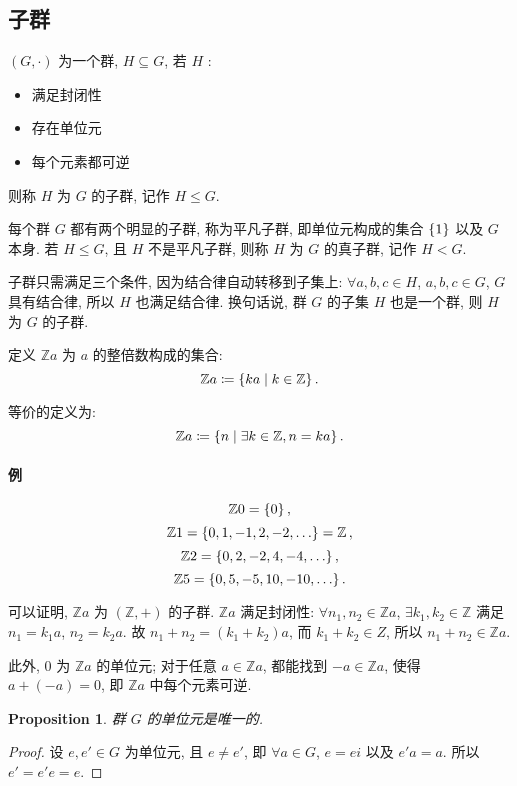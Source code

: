 \documentclass[UTF8]{ctexart}
\theoremstyle{mystyle}
\newtheorem{proposition}{Proposition}[section]
\theoremstyle{myremark}
\theoremstyle{plain}
\newcommand{\Z}{\mathbb Z}
\DeclarePairedDelimiter\set{\{}{\}}
\begin{document}
\subsection{子群}
\begin{definition}[\text{子群}]
    $ (G, \cdot) $ 为一个群, $ H \subseteq G $, 若 $ H $ :
    \begin{itemize}
        \item 满足封闭性
        \item 存在单位元
        \item 每个元素都可逆
    \end{itemize}
    则称 $ H $ 为 $ G $ 的子群, 记作 $ H \le G $.

    每个群 $ G $ 都有两个明显的子群, 称为平凡子群, 即单位元构成的集合 $ \set{1} $ 以及 $ G $ 本身. 若 $ H \le G $, 且 $ H $ 不是平凡子群, 则称 $ H $ 为 $ G $ 的真子群, 记作 $ H < G $.
\end{definition}

子群只需满足三个条件, 因为结合律自动转移到子集上: $ \forall a, b, c \in H $, $ a, b, c \in G $, $ G $ 具有结合律, 所以 $ H $ 也满足结合律. 换句话说, 群 $ G $ 的子集 $ H $ 也是一个群, 则 $ H $ 为 $ G $ 的子群.


定义 $ \Z a $ 为 $ a $ 的整倍数构成的集合:
\[ \Z a \coloneqq \set{k a \mid k \in \Z} \,.\]

等价的定义为:
\[ \Z a \coloneqq \set{n \mid \exists k \in \Z, n = k a} \,.\]

\paragraph{例}
\[ \Z 0 = \set{0} \,,\]
\[ \Z 1 = \set{0, 1, -1, 2, -2, \dots} = \Z \,,\]
\[ \Z 2 = \set{0, 2, -2, 4, -4, \dots} \,,\]
\[ \Z 5 = \set{0, 5, -5, 10, -10, \dots} \,.\]


可以证明, $ \Z a $ 为 $ (\Z, +) $ 的子群. $ \Z a $ 满足封闭性: $ \forall n_1, n_2 \in \Z a $, $ \exists k_1, k_2 \in \Z $ 满足 $ n_1 = k_1 a $, $ n_2 = k_2 a $. 故 $ n_1 + n_2 = (k_1 + k_2) a $, 而 $ k_1 + k_2 \in Z $, 所以 $ n_1 + n_2 \in \Z a $.

此外, $ 0 $ 为 $ \Z a $ 的单位元; 对于任意 $ a \in \Z a $, 都能找到 $ -a \in \Z a $, 使得 $ a + (-a) = 0 $, 即 $ \Z a $ 中每个元素可逆.


\begin{proposition}
    群 $ G $ 的单位元是唯一的.
\end{proposition}

\begin{proof}
    设 $ e, e' \in G $ 为单位元, 且 $ e \neq e' $, 即 $ \forall a \in G $, $ e = e i $ 以及 $ e' a = a $. 所以 $ e' = e' e = e $.
\end{proof}
\end{document}
